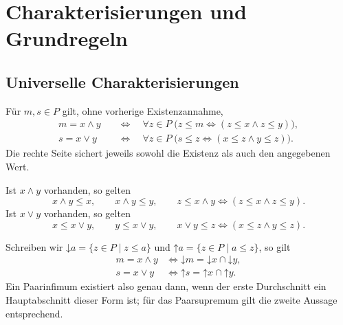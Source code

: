 \chapter{Charakterisierungen und Grundregeln}
\label{b14guide:ch:characterizations}

\section{Universelle Charakterisierungen}

\begin{theorem}
\label{b14guide:thm:candidate}
Für $m,s\in P$ gilt, ohne vorherige Existenzannahme,
\[
\begin{aligned}
 m=x\wedge y
 &\quad\Longleftrightarrow\quad
 \forall z\in P\;\bigl(z\leq m\Longleftrightarrow
                       (z\leq x\land z\leq y)\bigr),\\
 s=x\vee y
 &\quad\Longleftrightarrow\quad
 \forall z\in P\;\bigl(s\leq z\Longleftrightarrow
                       (x\leq z\land y\leq z)\bigr).
\end{aligned}
\]
Die rechte Seite sichert jeweils sowohl die Existenz als auch
den angegebenen Wert.
\end{theorem}

\begin{theorem}
\label{b14guide:thm:universal}
Ist $x\wedge y$ vorhanden, so gelten
\[
 x\wedge y\leq x,\qquad x\wedge y\leq y,\qquad
 z\leq x\wedge y\Longleftrightarrow(z\leq x\land z\leq y).
\]
Ist $x\vee y$ vorhanden, so gelten
\[
 x\leq x\vee y,\qquad y\leq x\vee y,\qquad
 x\vee y\leq z\Longleftrightarrow(x\leq z\land y\leq z).
\]
\end{theorem}

\begin{theorem}
\label{b14guide:thm:sections}
Schreiben wir $\mathord\downarrow a=\{z\in P\mid z\leq a\}$
und $\mathord\uparrow a=\{z\in P\mid a\leq z\}$, so gilt
\[
\begin{aligned}
 m=x\wedge y
 &\Longleftrightarrow
 \mathord\downarrow m
   =\mathord\downarrow x\cap\mathord\downarrow y,\\
 s=x\vee y
 &\Longleftrightarrow
 \mathord\uparrow s
   =\mathord\uparrow x\cap\mathord\uparrow y.
\end{aligned}
\]
Ein Paarinfimum existiert also genau dann, wenn der erste
Durchschnitt ein Hauptabschnitt dieser Form ist; für das
Paarsupremum gilt die zweite Aussage entsprechend.
\end{theorem}

